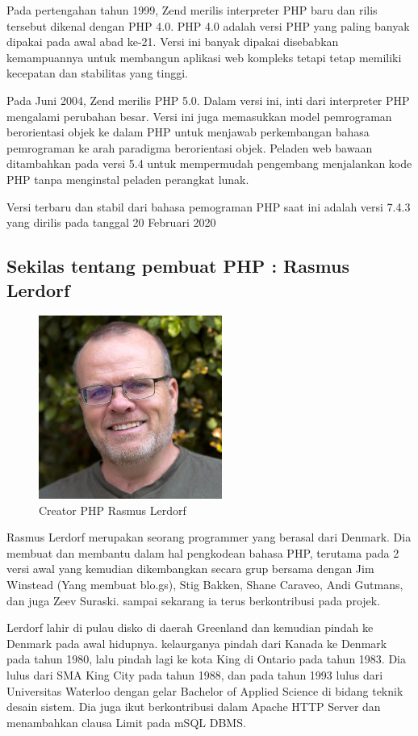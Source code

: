 Pada pertengahan tahun 1999, Zend merilis interpreter PHP baru dan rilis tersebut dikenal dengan PHP 4.0. PHP 4.0 adalah versi PHP yang paling banyak dipakai pada awal abad ke-21. Versi ini banyak dipakai disebabkan kemampuannya untuk membangun aplikasi web kompleks tetapi tetap memiliki kecepatan dan stabilitas yang tinggi.

Pada Juni 2004, Zend merilis PHP 5.0. Dalam versi ini, inti dari interpreter PHP mengalami perubahan besar. Versi ini juga memasukkan model pemrograman berorientasi objek ke dalam PHP untuk menjawab perkembangan bahasa pemrograman ke arah paradigma berorientasi objek. Peladen web bawaan ditambahkan pada versi 5.4 untuk mempermudah pengembang menjalankan kode PHP tanpa menginstal peladen perangkat lunak.

Versi terbaru dan stabil dari bahasa pemograman PHP saat ini adalah versi 7.4.3 yang dirilis pada tanggal 20 Februari 2020

\subsection{Sekilas tentang pembuat PHP : Rasmus Lerdorf}
	\begin{figure}[H]
		\includegraphics[width=6cm]{figures/web/rasmuslerdorf.jpg}
		\centering
		\caption{Creator PHP Rasmus Lerdorf }
	\end{figure}
Rasmus Lerdorf merupakan seorang programmer yang berasal dari Denmark. Dia membuat dan membantu dalam hal pengkodean bahasa PHP, terutama pada 2 versi awal yang kemudian dikembangkan secara grup bersama dengan Jim Winstead (Yang membuat blo.gs), Stig Bakken, Shane Caraveo, Andi Gutmans, dan juga Zeev Suraski. sampai sekarang ia terus berkontribusi pada projek.

Lerdorf lahir di pulau disko di daerah Greenland dan kemudian pindah ke Denmark pada awal hidupnya. kelaurganya pindah dari Kanada ke Denmark pada tahun 1980, lalu pindah lagi ke kota King di Ontario pada tahun 1983. Dia lulus dari SMA King City pada tahun 1988, dan pada tahun 1993 lulus dari Universitas Waterloo dengan gelar  Bachelor of Applied Science di bidang teknik desain sistem. Dia juga ikut berkontribusi dalam Apache HTTP Server dan menambahkan clausa Limit pada mSQL DBMS. 

